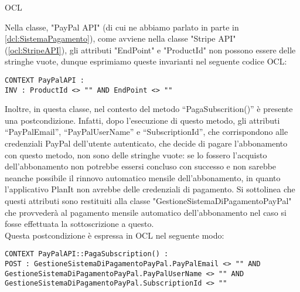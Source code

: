 \begin{listaPersonale}{OCL}
    \begin{center}
        
    \end{center}
    Nella classe, "PayPal API" (di cui ne abbiamo parlato in parte in \ref{dcl:SistemaPagamento}), come avviene nella classe "Stripe API" (\ref{ocl:StripeAPI}), gli attributi "EndPoint" e "ProductId" non possono essere delle stringhe vuote, dunque esprimiamo queste invarianti nel seguente codice OCL:
    \begin{lstlisting}
CONTEXT PayPalAPI :
INV : ProductId <> "" AND EndPoint <> ""
    \end{lstlisting}
    Inoltre, in questa classe, nel contesto del metodo “PagaSubscrition()” è presente una postcondizione. Infatti, dopo l’esecuzione di questo metodo, gli attributi “PayPalEmail”, “PayPalUserName” e “SubscriptionId”, che corrispondono alle credenziali PayPal dell’utente autenticato, che decide di pagare l’abbonamento con questo metodo, non sono delle stringhe vuote: se lo fossero l'acquisto dell'abbonamento non potrebbe essersi concluso con successo e non sarebbe neanche possibile il rinnovo automatico mensile dell'abbonamento, in quanto l'applicativo PlanIt non avrebbe delle credenziali di pagamento. Si sottolinea che questi attributi sono restituiti alla classe "GestioneSistemaDiPagamentoPayPal" che provvederà al pagamento mensile automatico dell'abbonamento nel caso si fosse effettuata la sottoscrizione a questo.\\
    Questa postcondizione è espressa in OCL nel seguente modo:
    \begin{lstlisting}
CONTEXT PayPalAPI::PagaSubscription() :
POST : GestioneSistemaDiPagamentoPayPal.PayPalEmail <> "" AND GestioneSistemaDiPagamentoPayPal.PayPalUserName <> "" AND GestioneSistemaDiPagamentoPayPal.SubscriptionId <> ""
    \end{lstlisting}






\end{listaPersonale}
